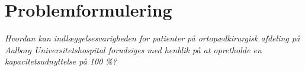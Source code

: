 \section{Problemformulering}
\textit{Hvordan kan indlæggelsesvarigheden for patienter på ortopædkirurgisk afdeling på Aalborg Universitetshospital forudsiges med henblik på at opretholde en kapacitetsudnyttelse på 100 \%?}